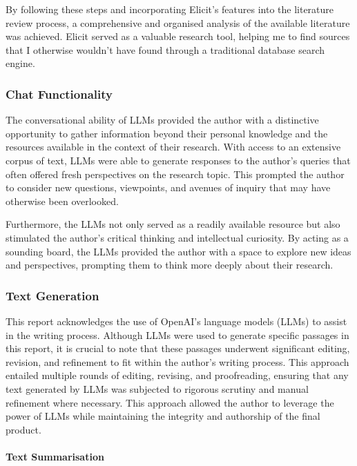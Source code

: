 \documentclass[
]{book}
\begin{document}
By following these steps and incorporating Elicit's features into the literature review process, a comprehensive and organised analysis of the available literature was achieved. Elicit served as a valuable research tool, helping me to find sources that I otherwise wouldn't have found through a traditional database search engine.

\hypertarget{chat-functionality}{%
\subsubsection{Chat Functionality}\label{chat-functionality}}

The conversational ability of LLMs provided the author with a distinctive opportunity to gather information beyond their personal knowledge and the resources available in the context of their research. With access to an extensive corpus of text, LLMs were able to generate responses to the author's queries that often offered fresh perspectives on the research topic. This prompted the author to consider new questions, viewpoints, and avenues of inquiry that may have otherwise been overlooked.

Furthermore, the LLMs not only served as a readily available resource but also stimulated the author's critical thinking and intellectual curiosity. By acting as a sounding board, the LLMs provided the author with a space to explore new ideas and perspectives, prompting them to think more deeply about their research.

\hypertarget{text-generation}{%
\subsubsection{Text Generation}\label{text-generation}}

This report acknowledges the use of OpenAI's language models (LLMs) to assist in the writing process. Although LLMs were used to generate specific passages in this report, it is crucial to note that these passages underwent significant editing, revision, and refinement to fit within the author's writing process. This approach entailed multiple rounds of editing, revising, and proofreading, ensuring that any text generated by LLMs was subjected to rigorous scrutiny and manual refinement where necessary. This approach allowed the author to leverage the power of LLMs while maintaining the integrity and authorship of the final product.

\hypertarget{text-summarisation}{%
\paragraph{Text Summarisation}\label{text-summarisation}}
\end{document}
